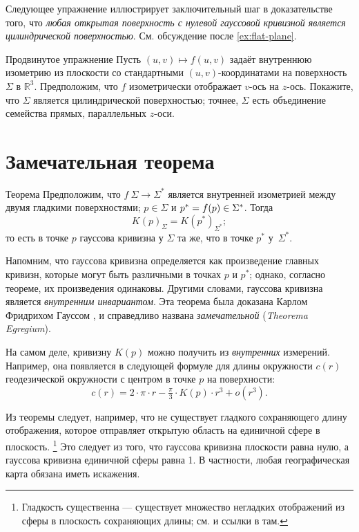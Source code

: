 Следующее упражнение иллюстрирует заключительный шаг в доказательстве того, что \textit{любая открытая поверхность с нулевой гауссовой кривизной является цилиндрической поверхностью}.
См. обсуждение после \ref{ex:flat-plane}.

\begin{thm}{Продвинутое упражнение}\label{ex:line-cylinder} 
Пусть $(u,v)\mapsto f(u,v)$ задаёт внутреннюю изометрию из плоскости со стандартными $(u,v)$-координатами на поверхность $\Sigma$ в $\mathbb{R}^3$.
Предположим, что $f$ изометрически отображает $v$-ось на $z$-ось.
Покажите, что $\Sigma$ является цилиндрической поверхностью;
точнее, $\Sigma$ есть объединение семейства прямых, параллельных $z$-оси.
\end{thm}

\section{Замечательная теорема}

\begin{thm}{Теорема}\label{thm:remarkable}
Предположим, что $f\:\Sigma\to \Sigma^{*}$ является внутренней изометрией между двумя гладкими поверхностями; $p\in \Sigma$ и $p^{*}\z=f(p)\in \Sigma^{*}$.
Тогда 
\[K(p)_{\Sigma}=K(p^{*})_{\Sigma^{*}};\]
то есть в точке $p$ гауссова кривизна у $\Sigma$ та же, что в точке $p^{*}$ у~$\Sigma^{*}$.
\end{thm}

Напомним, что гауссова кривизна определяется как произведение главных кривизн, которые могут быть различными в точках $p$ и $p^*$; однако, согласно теореме, их произведения одинаковы.
Другими словами, гауссова кривизна является \textit{внутренним инвариантом}.
Эта теорема была доказана Карлом Фридрихом Гауссом \cite{gauss}, и справедливо названа {}\emph{замечательной} ({}\emph{Theorema Egregium}).

На самом деле, кривизну $K(p)$ можно получить из \textit{внутренних} измерений.
Например, она появляется в следующей формуле для длины окружности $c(r)$ геодезической окружности с центром в точке $p$ на поверхности: 
\[c(r)=2\cdot\pi\cdot r-\tfrac\pi3\cdot K(p)\cdot r^3+o(r^3).\]

Из теоремы следует, например, что не существует гладкого сохраняющего длину отображения, которое отправляет открытую область на единичной сфере в плоскость.%
\footnote{Гладкость существенна --- существует множество негладких отображений из сферы в плоскость сохраняющих длины; см. \cite{petrunin-yashinski} и ссылки в там.}
Это следует из того, что гауссова кривизна плоскости равна нулю, а гауссова кривизна единичной сферы равна 1.
В частности, любая географическая карта обязана иметь искажения.



